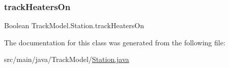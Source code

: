 \mbox{\label{classTrackModel_1_1Station_ae02bb86e9422f05d89f8c3cc52cc21bf}} 
\subsubsection{\texorpdfstring{track\+Heaters\+On}{trackHeatersOn}}
{\footnotesize\ttfamily Boolean Track\+Model.\+Station.\+track\+Heaters\+On}



The documentation for this class was generated from the following file\+:\begin{DoxyCompactItemize}
\item 
src/main/java/\+Track\+Model/\hyperlink{Station_8java}{Station.\+java}\end{DoxyCompactItemize}

